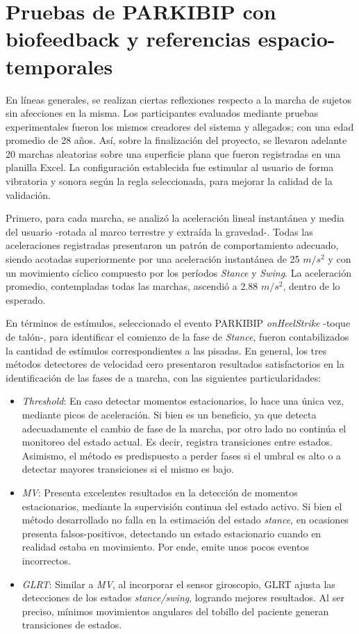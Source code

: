 \section{Pruebas de PARKIBIP con biofeedback y referencias espacio-temporales}

En líneas generales, se realizan ciertas reflexiones respecto a la marcha de sujetos sin afecciones en la misma. Los participantes evaluados mediante pruebas experimentales fueron los mismos creadores del sistema y allegados; con una edad promedio de 28 años. Así, sobre la finalización del proyecto, se llevaron adelante 20 marchas aleatorias sobre una superficie plana que fueron registradas en una planilla Excel. La configuración establecida fue estimular al usuario de forma vibratoria y sonora según la regla seleccionada, para mejorar la calidad de la validación.

Primero, para cada marcha, se analizó la aceleración lineal instantánea y media del usuario -rotada al marco terrestre y extraída la gravedad-. Todas las aceleraciones registradas presentaron un patrón de comportamiento adecuado, siendo acotadas superiormente por una aceleración instantánea de 25 $m/s^2$ y con un movimiento cíclico compuesto por los períodos \textit{Stance} y \textit{Swing}. La aceleración promedio, contempladas todas las marchas, ascendió a 2.88 $m/s^2$, dentro de lo esperado.

En términos de estímulos, seleccionado el evento PARKIBIP \textit{onHeelStrike} -toque de talón-, para identificar el comienzo de la fase de \textit{Stance}, fueron contabilizados la cantidad de estímulos correspondientes a las pisadas. En general, los tres métodos detectores de velocidad cero presentaron resultados satisfactorios en la identificación de las fases de a marcha, con las siguientes particularidades:

\begin{itemize}
    \item \textit{Threshold}: En caso detectar momentos estacionarios, lo hace una única vez, mediante picos de aceleración. Si bien es un beneficio, ya que detecta adecuadamente el cambio de fase de la marcha, por otro lado no continúa el monitoreo del estado actual. Es decir, registra transiciones entre estados. Asimismo, el método es predispuesto a perder fases si el umbral es alto o a detectar mayores transiciones si el mismo es bajo.
    \item \textit{MV}: Presenta excelentes resultados en la detección de momentos estacionarios, mediante la supervisión continua del estado activo. Si bien el método desarrollado no falla en la estimación del estado \textit{stance}, en ocasiones presenta falsos-positivos, detectando un estado estacionario cuando en realidad estaba en movimiento. Por ende, emite unos pocos eventos incorrectos.   
    \item \textit{GLRT}: Similar a \textit{MV}, al incorporar el sensor giroscopio, GLRT ajusta las detecciones de los estados \textit{stance/swing}, logrando mejores resultados. Al ser preciso, mínimos movimientos angulares del tobillo del paciente generan transiciones de estados.
\end{itemize}

